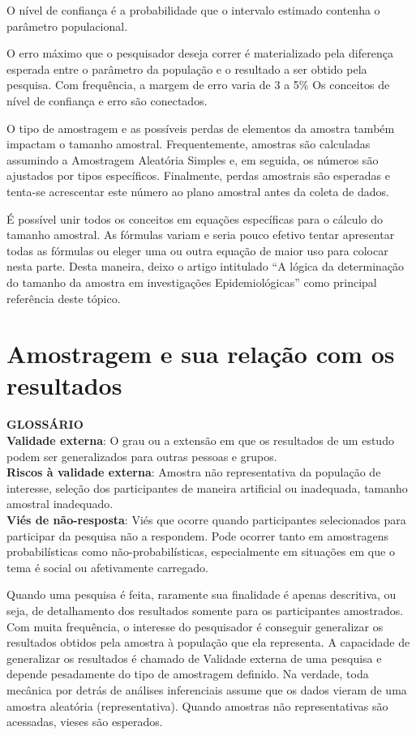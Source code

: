 \documentclass[
]{book}
\begin{document}
O nível de confiança é a probabilidade que o intervalo estimado contenha o parâmetro populacional.

O erro máximo que o pesquisador deseja correr é materializado pela diferença esperada entre o parâmetro da população e o resultado a ser obtido pela pesquisa. Com frequência, a margem de erro varia de 3 a 5\% Os conceitos de nível de confiança e erro são conectados.

O tipo de amostragem e as possíveis perdas de elementos da amostra também impactam o tamanho amostral. Frequentemente, amostras são calculadas assumindo a Amostragem Aleatória Simples e, em seguida, os números são ajustados por tipos específicos. Finalmente, perdas amostrais são esperadas e tenta-se acrescentar este número ao plano amostral antes da coleta de dados.

É possível unir todos os conceitos em equações específicas para o cálculo do tamanho amostral. As fórmulas variam e seria pouco efetivo tentar apresentar todas as fórmulas ou eleger uma ou outra equação de maior uso para colocar nesta parte. Desta maneira, deixo o artigo intitulado ``A lógica da determinação do tamanho da amostra em investigações Epidemiológicas'' como principal referência deste tópico.

\hypertarget{amostragem-e-sua-relauxe7uxe3o-com-os-resultados}{%
\section{Amostragem e sua relação com os resultados}\label{amostragem-e-sua-relauxe7uxe3o-com-os-resultados}}

\textbf{GLOSSÁRIO}\\
\textbf{Validade externa}: O grau ou a extensão em que os resultados de um estudo podem ser generalizados para outras pessoas e grupos.\\
\textbf{Riscos à validade externa}: Amostra não representativa da população de interesse, seleção dos participantes de maneira artificial ou inadequada, tamanho amostral inadequado.\\
\textbf{Viés de não-resposta}: Viés que ocorre quando participantes selecionados para participar da pesquisa não a respondem. Pode ocorrer tanto em amostragens probabilísticas como não-probabilísticas, especialmente em situações em que o tema é social ou afetivamente carregado.

Quando uma pesquisa é feita, raramente sua finalidade é apenas descritiva, ou seja, de detalhamento dos resultados somente para os participantes amostrados. Com muita frequência, o interesse do pesquisador é conseguir generalizar os resultados obtidos pela amostra à população que ela representa. A capacidade de generalizar os resultados é chamado de Validade externa de uma pesquisa e depende pesadamente do tipo de amostragem definido. Na verdade, toda mecânica por detrás de análises inferenciais assume que os dados vieram de uma amostra aleatória (representativa). Quando amostras não representativas são acessadas, vieses são esperados.
\end{document}
